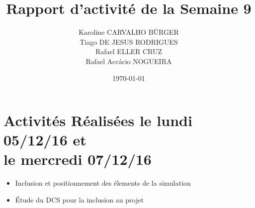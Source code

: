 \documentclass[11pt,a4paper,onecolumn]{articlewithlogo}
\title{Rapport d'activité de la Semaine 9}
\author{Karoline CARVALHO BÜRGER\\ Tiago DE JESUS RODRIGUES\\  Rafael ELLER CRUZ \\Rafael Accácio NOGUEIRA }
\date{\today}
\begin{document}
\maketitle
\section{Activités Réalisées le lundi 05/12/16 et \\le mercredi 07/12/16}
\begin{itemize}
	\renewcommand\labelitemi{$\circ$}
	\item Inclusion et positionnement des élements de la simulation
	\item Étude du DCS pour la inclusion au projet
\end{itemize}


%
\end{document}
